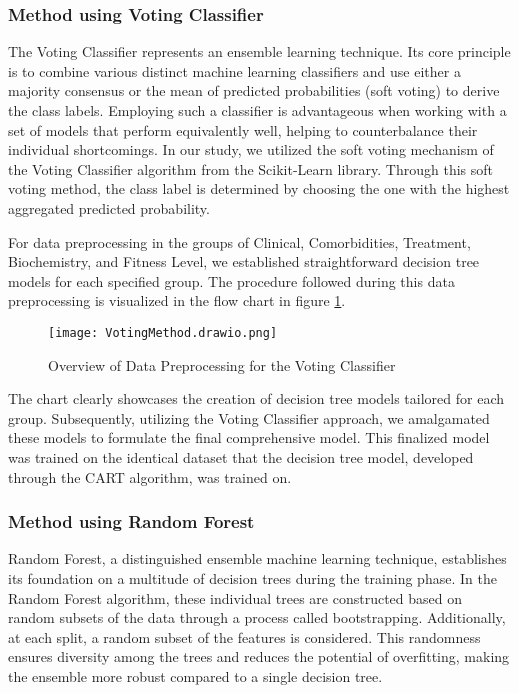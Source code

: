 \subsubsection{Method using Voting Classifier}
The Voting Classifier represents an ensemble learning technique. Its core principle is to combine various distinct machine learning classifiers and use either a majority consensus or the mean of predicted probabilities (soft voting) to derive the class labels. Employing such a classifier is advantageous when working with a set of models that perform equivalently well, helping to counterbalance their individual shortcomings. In our study, we utilized the soft voting mechanism of the Voting Classifier algorithm from the Scikit-Learn library. Through this soft voting method, the class label is determined by choosing the one with the highest aggregated predicted probability.

For data preprocessing in the groups of Clinical, Comorbidities, Treatment, Biochemistry, and Fitness Level, we established straightforward decision tree models for each specified group. The procedure followed during this data preprocessing is visualized in the flow chart in figure \ref{fig:flow chart of data processing for voting classifier}.
\begin{figure}[H]
\centering
\texttt{[image: VotingMethod.drawio.png]}
\caption{Overview of Data Preprocessing for the Voting Classifier}
\label{fig:flow chart of data processing for voting classifier}
\end{figure}

The chart clearly showcases the creation of decision tree models tailored for each group. Subsequently, utilizing the Voting Classifier approach, we amalgamated these models to formulate the final comprehensive model. This finalized model was trained on the identical dataset that the decision tree model, developed through the CART algorithm, was trained on.

\subsubsection{Method using Random Forest}
Random Forest, a distinguished ensemble machine learning technique, establishes its foundation on a multitude of decision trees during the training phase. In the Random Forest algorithm, these individual trees are constructed based on random subsets of the data through a process called bootstrapping. Additionally, at each split, a random subset of the features is considered. This randomness ensures diversity among the trees and reduces the potential of overfitting, making the ensemble more robust compared to a single decision tree.

